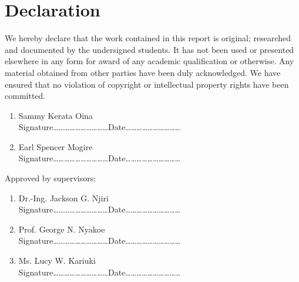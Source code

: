 \section*{Declaration}

We hereby declare that the work contained in this report is original; researched and documented by the undersigned students. It has not been used or presented elsewhere in any form for award of any academic qualification or otherwise. Any material obtained from other parties have been duly acknowledged. We have ensured that no violation of copyright or intellectual property rights have been committed.
\begin{enumerate}
	\item Sammy Kerata Oina\vspace*{.2cm}\\
	Signature\ldots\ldots\ldots\ldots\ldots\ldots\ldots\ldots\ldots\ldots Date\ldots\ldots\ldots\ldots\ldots\ldots\ldots\ldots\ldots\ldots
	\item Earl Spencer Mogire\vspace*{.2cm}\\
	Signature\ldots\ldots\ldots\ldots\ldots\ldots\ldots\ldots\ldots\ldots Date\ldots\ldots\ldots\ldots\ldots\ldots\ldots\ldots\ldots\ldots
\end{enumerate}

\vspace*{.5cm}
Approved by supervisors:
\begin{enumerate}
	\item Dr.-Ing. Jackson G. Njiri\vspace*{.2cm}\\
	Signature\ldots\ldots\ldots\ldots\ldots\ldots\ldots\ldots\ldots\ldots Date\ldots\ldots\ldots\ldots\ldots\ldots\ldots\ldots\ldots\ldots
	\item Prof. George N. Nyakoe\vspace*{.2cm}\\
	Signature\ldots\ldots\ldots\ldots\ldots\ldots\ldots\ldots\ldots\ldots Date\ldots\ldots\ldots\ldots\ldots\ldots\ldots\ldots\ldots\ldots
	\item Ms. Lucy W. Kariuki\vspace*{.2cm}\\
	Signature\ldots\ldots\ldots\ldots\ldots\ldots\ldots\ldots\ldots\ldots Date\ldots\ldots\ldots\ldots\ldots\ldots\ldots\ldots\ldots\ldots
\end{enumerate}


